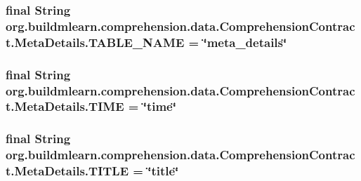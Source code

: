 \subsubsection[{\texorpdfstring{T\+A\+B\+L\+E\+\_\+\+N\+A\+ME}{TABLE_NAME}}]{\setlength{\rightskip}{0pt plus 5cm}final String org.\+buildmlearn.\+comprehension.\+data.\+Comprehension\+Contract.\+Meta\+Details.\+T\+A\+B\+L\+E\+\_\+\+N\+A\+ME = \char`\"{}meta\+\_\+details\char`\"{}\hspace{0.3cm}{\ttfamily [static]}}\hypertarget{classorg_1_1buildmlearn_1_1comprehension_1_1data_1_1ComprehensionContract_1_1MetaDetails_ab2d1d8968e538809485a307645aa820a}{}\label{classorg_1_1buildmlearn_1_1comprehension_1_1data_1_1ComprehensionContract_1_1MetaDetails_ab2d1d8968e538809485a307645aa820a}
\subsubsection[{\texorpdfstring{T\+I\+ME}{TIME}}]{\setlength{\rightskip}{0pt plus 5cm}final String org.\+buildmlearn.\+comprehension.\+data.\+Comprehension\+Contract.\+Meta\+Details.\+T\+I\+ME = \char`\"{}time\char`\"{}\hspace{0.3cm}{\ttfamily [static]}}\hypertarget{classorg_1_1buildmlearn_1_1comprehension_1_1data_1_1ComprehensionContract_1_1MetaDetails_a83e058abb4ebf3087c4487e39c579fad}{}\label{classorg_1_1buildmlearn_1_1comprehension_1_1data_1_1ComprehensionContract_1_1MetaDetails_a83e058abb4ebf3087c4487e39c579fad}
\subsubsection[{\texorpdfstring{T\+I\+T\+LE}{TITLE}}]{\setlength{\rightskip}{0pt plus 5cm}final String org.\+buildmlearn.\+comprehension.\+data.\+Comprehension\+Contract.\+Meta\+Details.\+T\+I\+T\+LE = \char`\"{}title\char`\"{}\hspace{0.3cm}{\ttfamily [static]}}\hypertarget{classorg_1_1buildmlearn_1_1comprehension_1_1data_1_1ComprehensionContract_1_1MetaDetails_a1ce5fa18c47b9e88954bfc8344451b1f}{}\label{classorg_1_1buildmlearn_1_1comprehension_1_1data_1_1ComprehensionContract_1_1MetaDetails_a1ce5fa18c47b9e88954bfc8344451b1f}


